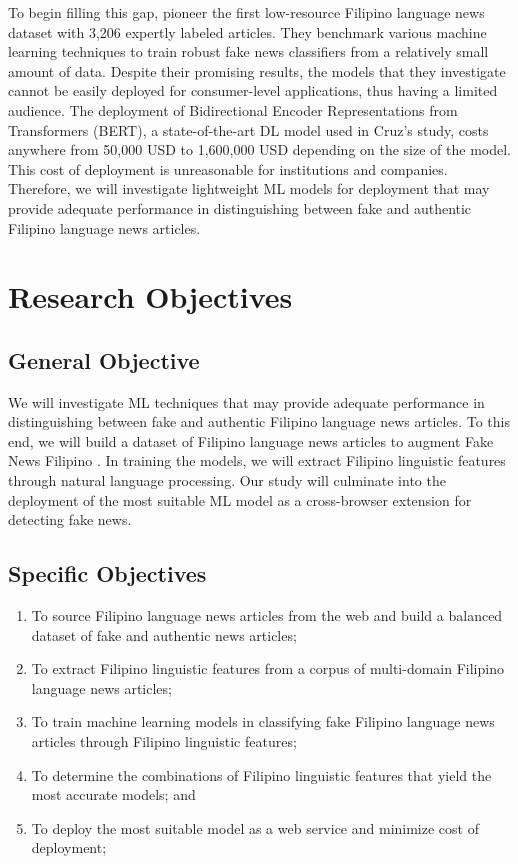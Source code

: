 To begin filling this gap,  pioneer the first low-resource Filipino language news dataset with 3,206 expertly labeled articles. They benchmark various machine learning techniques to train robust fake news classifiers from a relatively small amount of data. Despite their promising results, the models that they investigate cannot be easily deployed for consumer-level applications, thus having a limited audience. The deployment of Bidirectional Encoder Representations from Transformers (BERT), a state-of-the-art DL model used in Cruz's study, costs anywhere from 50,000 USD to 1,600,000 USD \cite{paleyes-2022} depending on the size of the model. This cost of deployment is unreasonable for institutions and companies. Therefore, we will investigate lightweight ML models for deployment that may provide adequate performance in distinguishing between fake and authentic Filipino language news articles.

\section{Research Objectives}
\label{sec:researchobjectives}

\subsection{General Objective}
\label{sec:generalobjective}

We will investigate ML techniques that may provide adequate performance in distinguishing between fake and authentic Filipino language news articles. To this end, we will build a dataset of Filipino language news articles to augment Fake News Filipino \cite{fake-news-filipino}. In training the models, we will extract Filipino linguistic features \cite{imperial-2020, imperial-2021} through natural language processing. Our study will culminate into the deployment of the most suitable ML model as a cross-browser extension for detecting fake news.

\subsection{Specific Objectives}
\label{sec:specificobjectives}

\begin{enumerate}
   \item To source Filipino language news articles from the web and build a balanced dataset of fake and authentic news articles;
   \item To extract Filipino linguistic features from a corpus of multi-domain Filipino language news articles;
   \item  To train machine learning models in classifying fake Filipino language news articles through Filipino linguistic features;
   \item To determine the combinations of Filipino linguistic features that yield the most accurate models; and
   \item To deploy the most suitable model as a web service and minimize cost of deployment;
\end{enumerate}

